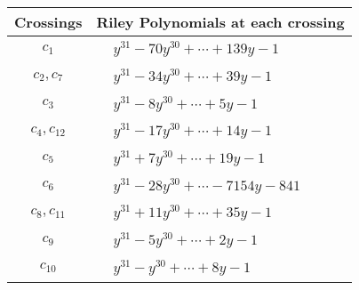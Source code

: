 \documentclass[1p]{elsarticle_modified}
\theoremstyle{definition}
\begin{document}
\begin{tabular}{m{50pt}|m{274pt}}
Crossings & \hspace{64pt}Riley Polynomials at each crossing \\
\hline $$\begin{aligned}c_{1}\end{aligned}$$&$\begin{aligned}
&y^{31}-70 y^{30}+\cdots+139 y-1
\end{aligned}$\\
\hline $$\begin{aligned}c_{2},c_{7}\end{aligned}$$&$\begin{aligned}
&y^{31}-34 y^{30}+\cdots+39 y-1
\end{aligned}$\\
\hline $$\begin{aligned}c_{3}\end{aligned}$$&$\begin{aligned}
&y^{31}-8 y^{30}+\cdots+5 y-1
\end{aligned}$\\
\hline $$\begin{aligned}c_{4},c_{12}\end{aligned}$$&$\begin{aligned}
&y^{31}-17 y^{30}+\cdots+14 y-1
\end{aligned}$\\
\hline $$\begin{aligned}c_{5}\end{aligned}$$&$\begin{aligned}
&y^{31}+7 y^{30}+\cdots+19 y-1
\end{aligned}$\\
\hline $$\begin{aligned}c_{6}\end{aligned}$$&$\begin{aligned}
&y^{31}-28 y^{30}+\cdots-7154 y-841
\end{aligned}$\\
\hline $$\begin{aligned}c_{8},c_{11}\end{aligned}$$&$\begin{aligned}
&y^{31}+11 y^{30}+\cdots+35 y-1
\end{aligned}$\\
\hline $$\begin{aligned}c_{9}\end{aligned}$$&$\begin{aligned}
&y^{31}-5 y^{30}+\cdots+2 y-1
\end{aligned}$\\
\hline $$\begin{aligned}c_{10}\end{aligned}$$&$\begin{aligned}
&y^{31}- y^{30}+\cdots+8 y-1
\end{aligned}$\\
\hline
\end{tabular}\\~\\
\end{document}
